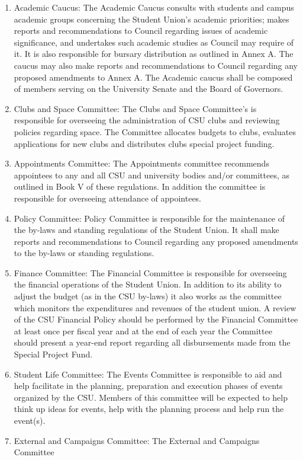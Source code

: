 \documentclass[oneside]{book}
\begin{document}
\begin{enumerate}
\begin{enumerate}
\item Academic Caucus: The Academic Caucus consults with students and campus
academic groups concerning the Student Union's academic priorities;
makes reports and recommendations to Council regarding issues of academic
significance, and undertakes such academic studies as Council may
require of it. It is also responsible for bursary distribution as
outlined in Annex A. The caucus may also make reports and recommendations
to Council regarding any proposed amendments to Annex A. The Academic
caucus shall be composed of members serving on the University Senate
and the Board of Governors. 
\item Clubs and Space Committee: The Clubs and Space Committee's is responsible
for overseeing the administration of CSU clubs and reviewing policies
regarding space. The Committee allocates budgets to clubs, evaluates
applications for new clubs and distributes clubs special project funding. 
\item Appointments Committee: The Appointments committee recommends appointees
to any and all CSU and university bodies and/or committees, as outlined in Book 
V of these regulations. In addition the committee is responsible for overseeing 
attendance of appointees. 
\item Policy Committee: Policy Committee is responsible for the maintenance
of the by-laws and standing regulations of the Student Union. It shall
make reports and recommendations to Council regarding any proposed
amendments to the by-laws or standing regulations. 
\item Finance Committee: The Financial Committee is responsible for overseeing
the financial operations of the Student Union. In addition to its
ability to adjust the budget (as in the CSU by-laws) it also works
as the committee which monitors the expenditures and revenues of the
student union. A review of the CSU Financial Policy should be performed
by the Financial Committee at least once per fiscal year and at the
end of each year the Committee should present a year-end report regarding
all disbursements made from the Special Project Fund. 
\item Student Life Committee: The Events Committee is responsible to aid and help
facilitate in the planning, preparation and execution phases of events
organized by the CSU. Members of this committee will be expected to
help think up ideas for events, help with the planning process and
help run the event(s). 
\item External and Campaigns Committee: The External and Campaigns Committee

\end{enumerate}
\end{enumerate}
\end{document}
